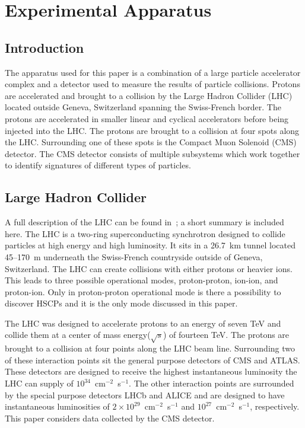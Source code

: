 \chapter{Experimental Apparatus \label{sec:app}}

\section{Introduction}

The apparatus used for this paper is a combination of a large particle accelerator complex and a detector used to measure the results of particle collisions.
Protons are accelerated and brought to a collision by the Large Hadron Collider (LHC)
located outside Geneva, Switzerland spanning the Swiss-French border. The protons are accelerated in smaller linear and cyclical accelerators before being injected
into the LHC. The protons are brought to a collision at four spots along the LHC. Surrounding one of these spots is the Compact Muon Solenoid (CMS) detector. The CMS
detector consists of multiple subsystems which work together to identify signatures of different types of particles.

\section{Large Hadron Collider \label{sec:LHC}}
A full description of the LHC can be found in~\cite{1748-0221-3-08-S08001}; a short summary is included here.
The LHC is a two-ring superconducting synchrotron designed
to collide particles at high energy and high luminosity. It sits in a 26.7~km tunnel located 45--170~m underneath the Swiss-French countryside outside of Geneva, Switzerland.
The LHC can create collisions with either protons or heavier ions. This leads to three possible operational modes, proton-proton, ion-ion, and proton-ion.
Only in proton-proton operational mode is there a possibility to discover HSCPs and it is the only mode discussed in this paper.

The LHC was designed to accelerate protons to an energy of seven TeV and collide them at a center of mass energy($\sqrt{s}$) of 
fourteen TeV. The protons are brought
to a collision at four points along the LHC beam line. Surrounding two of these interaction points sit the general purpose detectors of CMS and ATLAS. These detectors are 
designed to receive the highest instantaneous luminosity the LHC can supply of $10^{34}$~cm$^{-2}$~s$^{-1}$.
The other interaction points are surrounded by the special purpose detectors LHCb and ALICE and
are designed to have instantaneous luminosities of $2\times10^{29}$~cm$^{-2}$~s$^{-1}$ and $10^{27}$~cm$^{-2}$~s$^{-1}$, respectively. This paper considers data collected by the
CMS detector.


